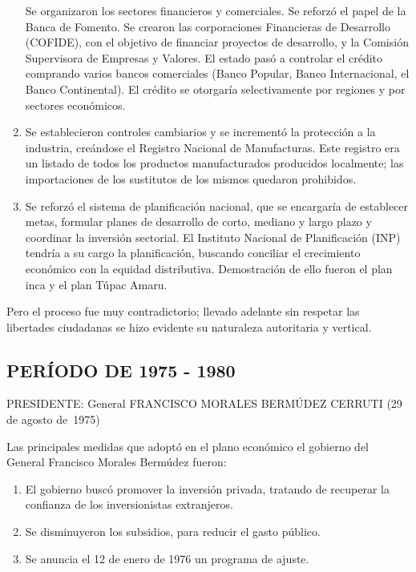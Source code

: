 \documentclass[
  jou,
  floatsintext,
  longtable,
  a4paper,
  nolmodern,
  notxfonts,
  notimes,
  colorlinks=true,linkcolor=blue,citecolor=blue,urlcolor=blue]{apa7}
\providecommand{\tightlist}{%
  \setlength{\itemsep}{0pt}\setlength{\parskip}{0pt}}
\begin{document}
\begin{enumerate}
  Se organizaron los sectores financieros y comerciales. Se reforzó el
  papel de la Banca de Fomento. Se crearon las corporaciones Financieras
  de Desarrollo (COFIDE), con el objetivo de financiar proyectos de
  desarrollo, y la Comisión Supervisora de Empresas y Valores. El estado
  pasó a controlar el crédito comprando varios bancos comerciales (Banco
  Popular, Banco Internacional, el Banco Continental). El crédito se
  otorgaría selectivamente por regiones y por sectores económicos.
\item
  Se establecieron controles cambiarios y se incrementó la protección a
  la industria, creándose el Registro Nacional de Manufacturas. Este
  registro era un listado de todos los productos manufacturados
  producidos localmente; las importaciones de los sustitutos de los
  mismos quedaron prohibidos.
\item
  Se reforzó el sistema de planificación nacional, que se encargaría de
  establecer metas, formular planes de desarrollo de corto, mediano y
  largo plazo y coordinar la inversión sectorial. El Instituto Nacional
  de Planificación (INP) tendría a su cargo la planificación, buscando
  conciliar el crecimiento económico con la equidad distributiva.
  Demostración de ello fueron el plan inca y el plan Túpac Amaru.
\end{enumerate}

Pero el proceso fue muy contradictorio; llevado adelante sin respetar
las libertades ciudadanas se hizo evidente su naturaleza autoritaria y
vertical.

\subsection{PERÍODO DE 1975 - 1980}\label{peruxedodo-de-1975---1980}

PRESIDENTE: General FRANCISCO MORALES BERMÚDEZ CERRUTI (29 de agosto
de~1975)

Las principales medidas que adoptó en el plano económico el gobierno del
General Francisco Morales Bermúdez fueron:

\begin{enumerate}
\def\labelenumi{\arabic{enumi}.}
\tightlist
\item
  El gobierno buscó promover la inversión privada, tratando de recuperar
  la confianza de los inversionistas extranjeros.
\item
  Se disminuyeron los subsidios, para reducir el gasto público.
\item
  Se anuncia el 12 de enero de 1976 un programa de ajuste.
\end{enumerate}
\end{document}
